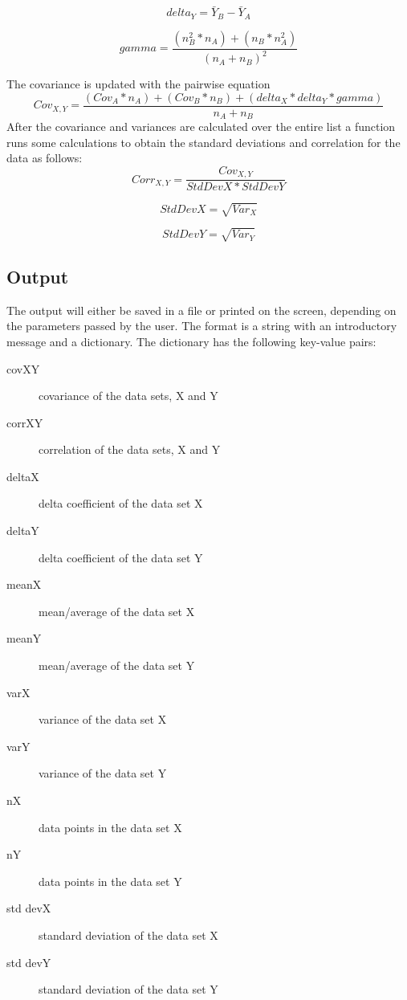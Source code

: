 \documentclass{article}
\begin{document}
$$delta_{Y} = \bar{Y}_{B} - \bar{Y}_{A}$$

$$gamma = \frac{(n_{B}^{2} * n_{A}) + (n_{B} *n_{A}^{2})}{(n_{A}+n_{B})^{2}}$$

The covariance is updated with the pairwise equation $$Cov_{X,Y} = \frac{(Cov_{A}*n_{A})+(Cov_{B}*n_{B})+(delta_{X} * delta_{Y}* gamma)}{n_{A}+n_{B}}$$
\cite{covariance}
After the covariance and variances are calculated over the entire list a function runs some calculations to obtain the standard deviations and correlation for the data as follows:
$$Corr_{X,Y} = \frac{Cov_{X,Y}}{StdDevX * StdDevY}$$

$$StdDevX = \sqrt{Var_{X}}$$

$$StdDevY = \sqrt{Var_{Y}}$$

     \subsection{Output}
The output will either be saved in a file or printed on the screen, depending on the parameters passed by the user. The format is a string with an introductory message and a dictionary. The dictionary has the following key-value pairs:
    \begin{description}
        \item[covXY]
        covariance of the data sets, X and Y
        \item[corrXY]
        correlation of the data sets, X and Y
        \item[deltaX]
        delta coefficient of the data set X
        \item[deltaY]
        delta coefficient of the data set Y
        \item[meanX]
        mean/average of the data set X
        \item[meanY]
        mean/average of the data set Y
        \item[varX]
        variance of the data set X
        \item[varY]
        variance of the data set Y
        \item[nX]
        data points in the data set X
        \item[nY]
        data points in the data set Y 
        \item[std devX]
        standard deviation of the data set X
        \item[std devY]
        standard deviation of the data set Y
   \end{description}
 \newpage
\end{document}
